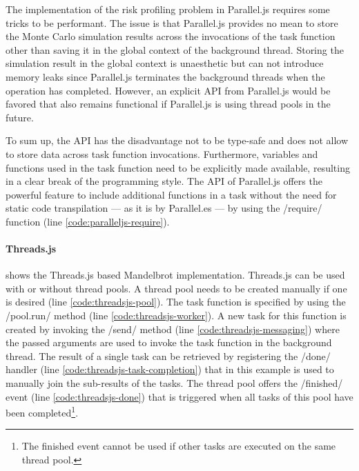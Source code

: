 The implementation of the risk profiling problem in Parallel.js requires some tricks to be performant. The issue is that Parallel.js provides no mean to store the Monte Carlo simulation results across the invocations of the task function other than saving it in the global context of the background thread. Storing the simulation result in the global context is unaesthetic but can not introduce memory leaks since Parallel.js terminates the background threads when the operation has completed. However, an explicit API from Parallel.js would be favored that also remains functional if Parallel.js is using thread pools in the future.

To sum up, the API has the disadvantage not to be type-safe and does not allow to store data across task function invocations. Furthermore, variables and functions used in the task function need to be explicitly made available, resulting in a clear break of the programming style. The API of Parallel.js offers the powerful feature to include additional functions in a task without the need for static code transpilation --- as it is by Parallel.es --- by using the \javascriptinline/require/ function (line \ref{code:paralleljs-require}).

\paragraph{Threads.js}
 shows the Threads.js based Mandelbrot implementation. Threads.js can be used with or without thread pools. A thread pool needs to be created manually if one is desired (line \ref{code:threadsjs-pool}). The task function is specified by using the \javascriptinline/pool.run/ method (line \ref{code:threadsjs-worker}). A new task for this function is created by invoking the \javascriptinline/send/ method (line \ref{code:threadsjs-messaging}) where the passed arguments are used to invoke the task function in the background thread. The result of a single task can be retrieved by registering the \javascriptinline/done/ handler (line \ref{code:threadsjs-task-completion}) that in this example is used to manually join the sub-results of the tasks. The thread pool offers the \javascriptinline/finished/ event (line \ref{code:threadsjs-done}) that is triggered when all tasks of this pool have been completed\footnote{The finished event cannot be used if other tasks are executed on the same thread pool.}.

